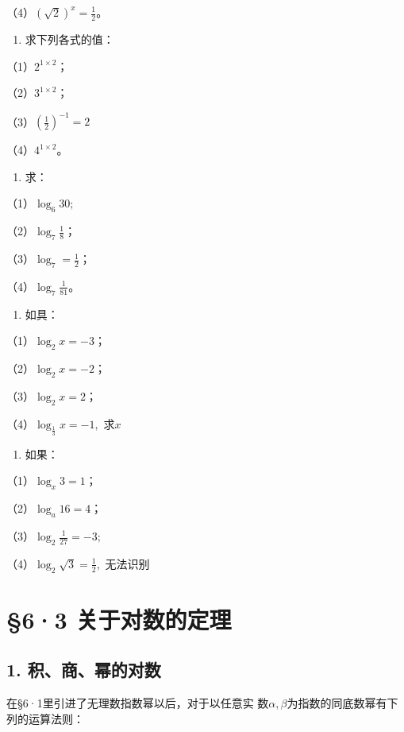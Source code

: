 （4）\((\sqrt{2})^{x} = \frac{1}{2}\)。

\begin{enumerate}[start=4]
\item
  求下列各式的值：
\end{enumerate}

（1）\(2^{1 \times 2}\)；

（2）\(3^{1 \times 2}\)；

（3）\(\left(\frac{1}{2}\right)^{-1} = 2\)

（4）\(4^{1 \times 2}\)。

\begin{enumerate}[start=5]
\item
  求：
\end{enumerate}

（1）\(\log_{6}30;\)

（2）\(\log_7\frac{1}{8}\)；

（3）\(\log_7 = \frac{1}{2}\)；

（4）\(\log_7\frac{1}{81}\)。

\begin{enumerate}[start=6]
\item
  如具：
\end{enumerate}

（1）\(\log_2 x = -3\)；

（2）\(\log_{2} x = -2\)；

（3）\(\log_{2} x = 2\)；

（4）\(\log_{\frac{1}{3}} x = -1,\) 求\(x\)

\begin{enumerate}[start=7]
\item
  如果：
\end{enumerate}

（1）\(\log_x 3 = 1\)；

（2）\(\log_a 16 = 4\)；

（3）\(\log_2\frac{1}{27} = -3;\)

（4）\(\log_2\sqrt{3} = \frac{1}{2},\) 无法识别

\section{§6·3 关于对数的定理}

\subsection{1. 积、商、幂的对数}

在§6·1里引进了无理数指数幂以后，对于以任意实
数\(\alpha, \beta\)为指数的同底数幂有下列的运算法则：

